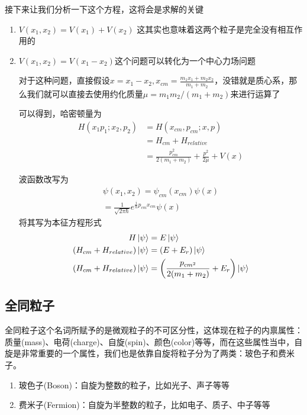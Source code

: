 \documentclass{article}
\begin{document}
接下来让我们分析一下这个方程，这将会是求解的关键
\begin{enumerate}
	\item[case1:] $V(x_1,x_2)=V(x_1)+V(x_2)$ 这其实也意味着这两个粒子是完全没有相互作用的
	\item[case2:] $V(x_1,x_2)=V(x_1-x_2)$这个问题可以转化为一个中心力场问题

	      对于这种问题，直接假设$\displaystyle x=x_1-x_2,x_{cm}=\frac{m_1x_1+m_2x_2}{m_1+m_2}$，没错就是质心系，那么我们就可以直接去使用约化质量$\mu=m_1m_2/(m_1+m_2)$来进行运算了

	      可以得到，哈密顿量为
	      \begin{align*}
		      H(x_1p_1;x_2,p_2) & =H(x_{cm},p_{cm};x,p)                              \\
		                        & =H_{cm}+H_{relative}                               \\
		                        & =\frac{p_{cm}^2}{2(m_1+m_2)}+\frac{p^2}{2\mu}+V(x)
	      \end{align*}

	      波函数改写为
	      \begin{align*}
		      \psi(x_1,x_2)=\psi_{cm}(x_{cm})\psi(x) \\
		      =\frac{1}{\sqrt{2\pi\hbar}}e^{\frac{i}{\hbar}p_{cm}x_{cm}}\psi(x)
	      \end{align*}
	      将其写为本征方程形式
	      \begin{align*}
		      H\ket{\psi}                     & =E\ket{\psi}                                            \\
		      (H_{cm}+H_{relative})\ket{\psi} & =(E+E_r)\ket{\psi}                                      \\
		      (H_{cm}+H_{relative})\ket{\psi} & =\left(\frac{p_{cm^2}}{2(m_1+m_2)}+E_r\right)\ket{\psi}
	      \end{align*}
\end{enumerate}


\subsection{全同粒子}
全同粒子这个名词所赋予的是微观粒子的不可区分性，这体现在粒子的内禀属性：质量(mass)、电荷(charge)、自旋(spin)、颜色(color)等等，而在这些属性当中，自旋是非常重要的一个属性，我们也是依靠自旋将粒子分为了两类：玻色子和费米子。

\begin{enumerate}
	\item 玻色子(Boson)：自旋为整数的粒子，比如光子、声子等等
	\item 费米子(Fermion)：自旋为半整数的粒子，比如电子、质子、中子等等
\end{enumerate}
\end{document}

